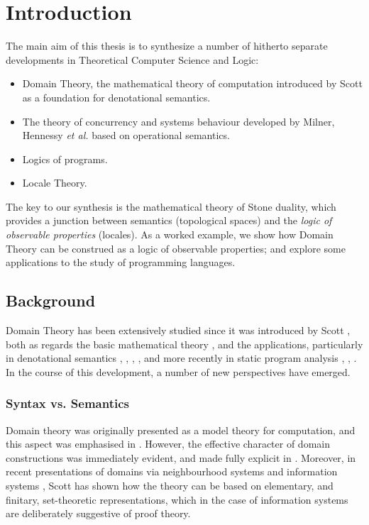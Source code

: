 \tableofcontents
\chapter{Introduction}
The main aim of this thesis is to synthesize a number of hitherto separate developments in Theoretical Computer Science and Logic:
\begin{itemize}
\item Domain Theory, the mathematical theory of computation introduced by Scott as a foundation for denotational semantics.
\item The theory of concurrency and systems behaviour developed by Milner, Hennessy {\it et al.} based on operational semantics.
\item Logics of programs.
\item Locale Theory.
\end{itemize}
The key to our synthesis is the mathematical theory of Stone duality, which provides a junction between semantics (topological spaces) and the {\em logic of observable properties} (locales).
As a worked example, we show how Domain Theory can be construed as a logic of observable properties;
and explore some applications to the study of programming languages.
\section{Background}
Domain Theory has been extensively studied since it was introduced by Scott 
\cite{Sco70}, both as regards the basic mathematical theory \cite{PloLN}, 
and the applications, particularly in denotational semantics 
\cite{MS76}, \cite{Sto77}, \cite{Gor79}, \cite{Sch86}, and more recently in static program analysis 
\cite{Myc81}, \cite{Nie84}, \cite{AH87}.
In the course of this development, a number of new perspectives have emerged.
\subsection*{Syntax vs. Semantics}
Domain theory was originally presented as a model theory for computation,
and this aspect was emphasised in \cite{Sco70,Sco80b}.
However, the effective character of domain constructions was immediately 
evident, and made fully explicit in \cite{EC76,Sco76,Smy77,Kan79}.
Moreover, in recent presentations of domains via neighbourhood systems and information systems \cite{Sco81,Sco82}, Scott has shown how the theory can be based on elementary, and finitary, set-theoretic representations, which in the case of information systems are deliberately suggestive of proof theory.


